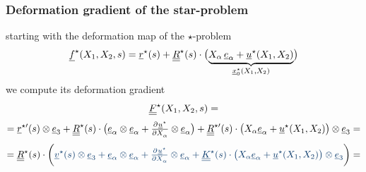 \begin{frame}
  \frametitle{Deformation gradient of the star-problem}

  starting with the deformation map of the $\star$-problem
  \begin{displaymath}
    \underline{f}^{\star}(X_1,X_2,s) =
    \underline{r}^{\star}(s) + 
    \underline{\underline{R}}^{\star}(s) \cdot \bigl( \underbrace{ X_{\alpha} \, \underline{e}_{\alpha} + \underline{u}^{\star}(X_1,X_2) }_{\underline{x}_0^{\star}(X_1,X_2)} \bigr)
  \end{displaymath}
  we compute its deformation gradient
  \vspace{0.3em}
  \begin{displaymath}
    \underline{\underline{F}}^{\star}(X_1,X_2,s) =
  \end{displaymath}
  \begin{displaymath}
    = \underline{r}^{\star \prime}(s) \otimes \underline{e}_3 +
      \doubleunderline{R}^{\star}(s) \cdot \bigl( \underline{e}_{\alpha} \otimes \underline{e}_{\alpha} +
      \pd{\underline{u}^{\star}}{X_{\alpha}} \otimes \underline{e}_{\alpha} \bigr) +
      \doubleunderline{R}^{\star \prime}(s) \cdot \bigl( X_{\alpha} \underline{e}_{\alpha} + \underline{u}^{\star}(X_1,X_2) \bigr) \otimes \underline{e}_3 =
  \end{displaymath}
  \begin{displaymath}
    = \doubleunderline{R}^{\star}(s) \cdot \biggl( {\color{faublue}
        \underline{v}^{\star}(s) \otimes \underline{e}_3 +
        \underline{e}_{\alpha} \otimes \underline{e}_{\alpha} + 
        \pd{\underline{u}^{\star}}{X_{\alpha}} \otimes \underline{e}_{\alpha} +
        \doubleunderline{K}^{\star}(s) \cdot \bigl( X_{\alpha} \underline{e}_{\alpha} + \underline{u}^{\star}(X_1,X_2) \bigr) \otimes \underline{e}_3 }
      \biggr) =
  \end{displaymath}
  \begin{displaymath}

\end{displaymath}
\end{frame}
